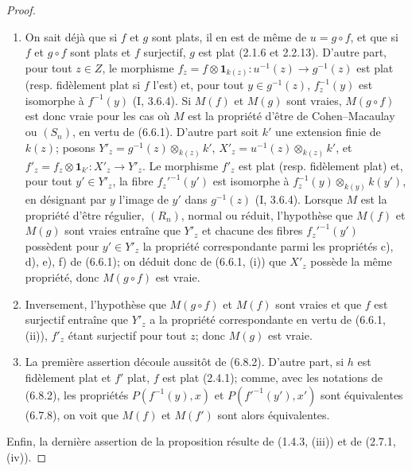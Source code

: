 \begin{proof}
\begin{enumerate}
\item[(i)] On sait déjà que si $f$ et $g$ sont plats, il en est de même de
$u=g\circ f$, et que si $f$ et $g\circ f$ sont plats et $f$ surjectif, $g$ est
plat (2.1.6 et 2.2.13). D'autre part, pour tout $z\in Z$, le morphisme
$f_z=f\otimes\mathbf 1_{k(z)}:u^{-1}(z)\to g^{-1}(z)$ est plat (resp.
fidèlement plat si $f$ l'est) et, pour tout $y\in g^{-1}(z)$,
$f_z^{-1}(y)$ est isomorphe à $f^{-1}(y)$ (I, 3.6.4). Si $M(f)$ et $M(g)$
sont vraies, $M(g\circ f)$ est donc vraie pour les cas où $M$ est la propriété
d'être de Cohen--Macaulay ou $(S_n)$, en vertu de (6.6.1). D'autre part soit
$k'$ une extension finie de $k(z)$; posons
$Y'_z=g^{-1}(z)\otimes_{k(z)}k'$, $X'_z=u^{-1}(z)\otimes_{k(z)}k'$, et
$f'_z=f_z\otimes\mathbf 1_{k'}:X'_z\to Y'_z$. Le morphisme $f'_z$ est plat
(resp. fidèlement plat) et, pour tout $y'\in Y'_z$, la fibre $f_z'^{-1}(y')$
est isomorphe à $f_z^{-1}(y)\otimes_{k(y)}k(y')$, en désignant par $y$ l'image
de $y'$ dans $g^{-1}(z)$ (I, 3.6.4). Lorsque $M$ est la propriété d'être
régulier, $(R_n)$, normal ou réduit, l'hypothèse que $M(f)$ et $M(g)$ sont
vraies entraîne que $Y'_z$ et chacune des fibres $f_z'^{-1}(y')$ possèdent
pour $y'\in Y'_z$ la propriété correspondante parmi les propriétés c), d),
e), f) de (6.6.1); on déduit donc de (6.6.1, (i)) que $X'_z$ possède la même
propriété, donc $M(g\circ f)$ est vraie.
\item[(ii)] Inversement, l'hypothèse que $M(g\circ f)$ et $M(f)$ sont vraies
et que $f$ est surjectif entraîne que $Y'_z$ a la propriété correspondante en
vertu de (6.6.1, (ii)), $f'_z$ étant surjectif pour tout $z$; donc $M(g)$ est
vraie.
\item[(iii)] La première assertion découle aussitôt de (6.8.2). D'autre part,
si $h$ est fidèlement plat et $f'$ plat, $f$ est plat (2.4.1); comme, avec les
notations de (6.8.2), les propriétés $P(f^{-1}(y),x)$ et
$P(f'^{-1}(y'),x')$ sont équivalentes (6.7.8), on voit que $M(f)$ et $M(f')$
sont alors équivalentes.
\end{enumerate}
Enfin, la dernière assertion de la proposition résulte de (1.4.3, (iii)) et
de (2.7.1, (iv)).
\end{proof}

